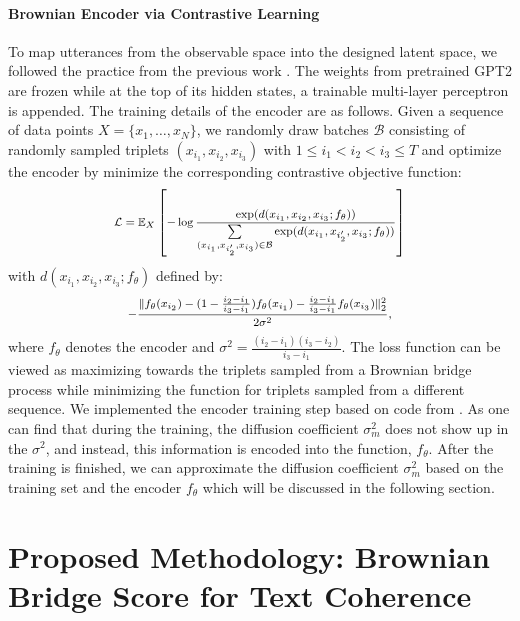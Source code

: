 \documentclass[letterpaper]{article}
\begin{document}
\paragraph{Brownian Encoder via Contrastive Learning}
To map utterances from the observable space into the designed latent space, we followed the practice from the previous work \citep{wang2023language}. The weights from pretrained GPT2 \citep{radford2019language} are frozen while at the top of its hidden states, a trainable multi-layer perceptron is appended.
The training details of the encoder are as follows. Given a sequence of data points $X=\{x_1,\dots,x_N\}$, we randomly draw batches $\mathcal{B}$ consisting of randomly sampled triplets $(x_{i_1}, x_{i_2}, x_{i_3})$ with $1\le i_1 < i_2 < i_3 \le T$ and optimize the encoder by minimize the corresponding contrastive objective function:
\begin{equation*}
\footnotesize
\begin{aligned}
\mathcal{L} =\mathbb{E}_X\left[-\log \frac{\exp(d(x_{i_1}, x_{i_2}, x_{i_3}; f_\theta))}{\sum\limits_{(x_{i_1}, x_{i_2'},x_{i_3})\in \mathcal{B}}\exp(d(x_{i_1}, x_{i_2'},x_{i_3}; f_\theta))}\right]
\end{aligned}
\end{equation*}
with $d(x_{i_1}, x_{i_2},x_{i_3}; f_\theta)$ defined by:
\begin{equation*}
\footnotesize
\begin{aligned}
-\frac{\|f_\theta(x_{i_2}) - (1-\frac{i_2-i_1}{i_3-i_1})f_\theta(x_{i_1}) -\frac{i_2-i_1}{i_3-i_1}f_\theta (x_{i_3})\|_2^2}{2\sigma^2},
\end{aligned}
\end{equation*}
where $f_\theta$ denotes the encoder and $\sigma^2=\frac{(i_2-i_1)(i_3-i_2)}{i_3-i_1}$. The loss function can be viewed as maximizing towards the triplets sampled from a Brownian bridge process while minimizing the function for triplets sampled from a different sequence. We implemented the encoder training step based on code from \cite{wang2023language}. As one can find that during the training, the diffusion coefficient $\sigma^2_m$ does not show up in the  $\sigma^2$, and instead, this information is encoded into the function, $f_\theta$. After the training is finished, we can approximate the diffusion coefficient $\sigma^2_m$ based on the training set and the encoder $f_\theta$ which will be discussed in the following section.

\section{Proposed Methodology: Brownian Bridge Score for Text Coherence}
\end{document}
